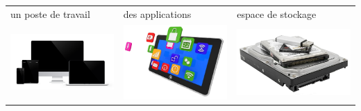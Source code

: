 \documentclass{beamer}
\begin{document}
\begin{frame}
\begin{center}
	\begin{tabular}{p{}p{}p{}}
	un poste de travail & des applications & espace de stockage \\
	\includegraphics[height=.25\textheight]{..//img/Bweb01-environnement/poste-travail.png}&
	\includegraphics[height=.25\textheight]{..//img/Bweb01-environnement/applications.jpg}&
	\includegraphics[height=.25\textheight]{..//img/Bweb01-environnement/stockage.jpg}\\
	

\end{tabular}
\end{center}
\end{frame}
\end{document}
